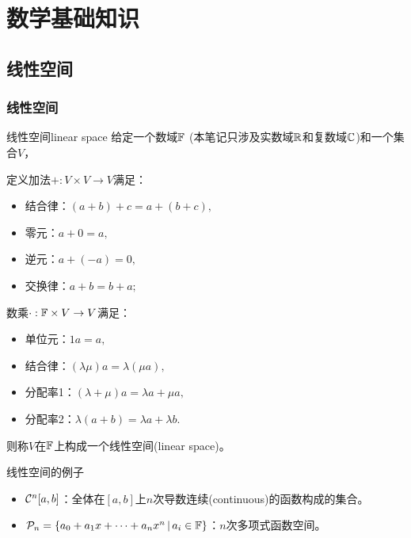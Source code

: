 \chapter{数学基础知识}
\label{chap:math basics}

\section{线性空间}
\label{sec:linear space}

\subsection{线性空间}

\begin{definition}
    {线性空间}{linear space}
    给定一个数域$\mathbb F$ (本笔记只涉及实数域$\mathbb R$和复数域$\mathbb C$)和一个集合$V$，
    
    定义加法$+:V\times V\to V$满足：
    \begin{itemize}
        \item 结合律：$(a+b)+c=a+(b+c),$
        \item 零元：$a+0=a,$
        \item 逆元：$a+(-a)=0,$
        \item 交换律：$a+b=b+a;$
    \end{itemize}
    数乘$\cdot:\mathbb F\times V\to V$满足：
    \begin{itemize}
        \item 单位元：$1a=a,$
        \item 结合律：$(\lambda\mu)a=\lambda(\mu a),$
        \item 分配率1：$(\lambda+\mu)a=\lambda a+\mu a,$
        \item 分配率2：$\lambda(a+b)=\lambda a+\lambda b.$
    \end{itemize}
    则称$V$在$\mathbb F$上构成一个线性空间(linear space)。
\end{definition}

\begin{example}
    {线性空间的例子}{}
    \begin{itemize}
        \item $\mathcal C^n[a,b]$：全体在$[a,b]$上$n$次导数连续(continuous)的函数构成的集合。
        \item $\mathcal P_n=\left\{a_0+a_1x+\cdots+a_nx^n\,\middle\vert\,a_i\in\mathbb F\right\}$：$n$次多项式函数空间。
    \end{itemize}
\end{example}

